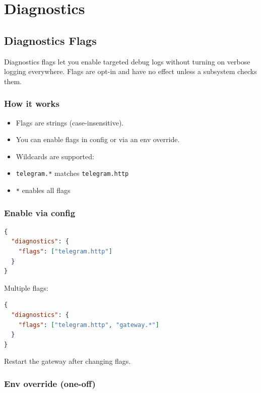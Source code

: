 \chapter{Diagnostics}

\section{Diagnostics Flags}


Diagnostics flags let you enable targeted debug logs without turning on verbose logging everywhere. Flags are opt-in and have no effect unless a subsystem checks them.

\subsection{How it works}


\begin{itemize}
  \item Flags are strings (case-insensitive).
  \item You can enable flags in config or via an env override.
  \item Wildcards are supported:
  \item \texttt{telegram.*} matches \texttt{telegram.http}
  \item \texttt{*} enables all flags
\end{itemize}


\subsection{Enable via config}


\begin{lstlisting}[language=json]
{
  "diagnostics": {
    "flags": ["telegram.http"]
  }
}
\end{lstlisting}


Multiple flags:

\begin{lstlisting}[language=json]
{
  "diagnostics": {
    "flags": ["telegram.http", "gateway.*"]
  }
}
\end{lstlisting}


Restart the gateway after changing flags.

\subsection{Env override (one-off)}


